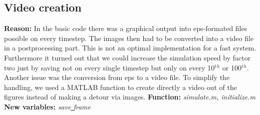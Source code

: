 \documentclass[11pt]{article}
\begin{document}
\subsection{Video creation}
\textbf{Reason:}
\newline
In the basic code there was a graphical output into eps-formated files possible on every timestep. The images then had to be converted into a video file in a postprocessing part. This is not an optimal implementation for a fast system. Furthermore it turned out that we could increase the simulation speed by factor two just by saving not on every single timestep but only on every 10$^t$$^h$ or 100$^t$$^h$. Another issue was the conversion from eps to a video file. To simplify the handling, we used a MATLAB function to create directly a video out of the figures instead of making a detour via images.
\newline
\textbf{Function:}
\newline
\textit{simulate.m, initialize.m}
\newline
\textbf{New variables:}
\newline
\textit{save\underline{ }frame}
\newline
%
\end{document}
